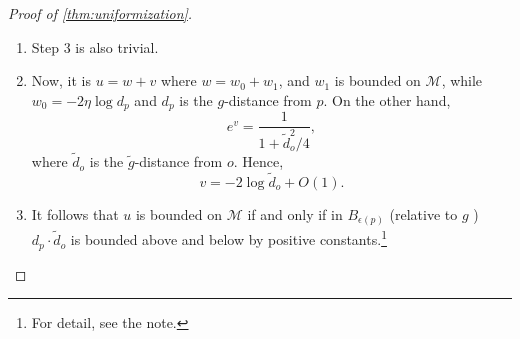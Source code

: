 \begin{proof}[Proof of \autoref{thm:uniformization}]
\begin{enumerate}
		      \begin{claim}
			      There is a solution \(w_1\) of \(\Delta _g w_1 = f\) unique up to an additive constant, provided that
			      \[
				      \int _\mathcal{M} f \,\mathrm{d} \mu _g = 0.
			      \]
		      \end{claim}
		      \begin{explanation}
			      To prove this, we integrate \(f\) on \(\mathcal{M} \setminus B_\delta (P)\) with \(0 < \delta \leq \epsilon \), i.e.,
			      \[
				      -\int _{\mathcal{M} \setminus B_{\epsilon (p)} }\Delta _g w_0 \,\mathrm{d} \mu _g = \int _{\partial B_\delta (p)} \nabla _N w_0 \,\mathrm{d} s,
			      \]
			      where \(\mathrm{d} s\) is the element of arc length of \(\partial B_\delta (p)\). In \(\overline{B} _\delta (p)\) we have, in polar coordinates, \(w_0 = -2 \log r\) and \(\nabla _N= \partial / \partial r\), so \(\nabla _N w_0 = -2 / r\). Moreover, it is \(\mathrm{d} s = R\, \mathrm{d} \theta \). So, we have
			      \[
				      \int _{\partial B_\delta (p)}\nabla _N w_0 \,\mathrm{d} s
				      = -\frac{2}{\delta } \int_{0}^{2\pi } R(\delta , \theta ) \,\mathrm{d}\theta \to -4\pi \text{ as } \delta \to 0.
			      \]
			      On the other hand,
			      \[
				      \lim_{\delta \to 0} \int _{\mathcal{M} \setminus B_\delta (p)}K \,\mathrm{d} \mu _g = \int _\mathcal{M} K \,\mathrm{d} \mu _g = 4\pi
			      \]
			      by \hyperref[thm:Gauss-Bonnet]{Gauss-Bonnet}. We conclude that indeed \(\int _\mathcal{M} f \,\mathrm{d} \mu _g = 0\).
		      \end{explanation}
		      So, the equation is solvable for \(w_1\). In fact, we can show that \(w_1\) is bounded on \(\mathcal{M} \) and is in fact continuous.\footnote{For, \(f=\Delta _g w_1\) being bounded, in particular \(f\in L^2(\mathcal{M} )\) implies \(w_1\in H_2(\mathcal{M} )\), hence \(w_1\) is bounded.}
		\item Step \(3\) is also trivial.
		\item Now, it is \(u = w+v\) where \(w = w_0 + w_1\), and \(w_1\) is bounded on \(\mathcal{M} \), while \(w_0 = -2 \eta \log d_p\) and \(d_p\) is the \(g\)-distance from \(p\). On the other hand,
		      \[
			      e^v = \frac{1}{1 + \widetilde{d} ^2_o / 4},
		      \]
		      where \(\widetilde{d} _o\) is the \(\widetilde{g} \)-distance from \(o\). Hence,
		      \[
			      v = -2 \log \widetilde{d} _o + O(1).
		      \]
		\item It follows that \(u\) is bounded on \(\mathcal{M} \) if and only if in \(B_{\epsilon (p)} \) (relative to \(g\) )\(d_p\cdot \widetilde{d} _o\) is bounded above and below by positive constants.\footnote{For detail, see the note.}
	\end{enumerate}
\end{proof}


